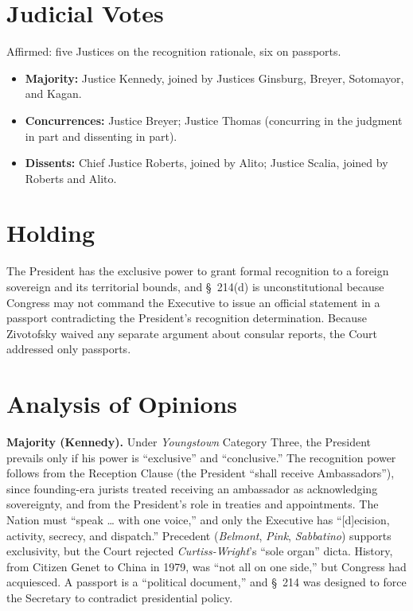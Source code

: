 \documentclass[12pt]{article}
\begin{document}
\section{Judicial Votes}

Affirmed: five Justices on the recognition rationale, six on passports.
\begin{itemize}
\item \textbf{Majority:} Justice Kennedy, joined by Justices Ginsburg, Breyer, Sotomayor, and Kagan.
\item \textbf{Concurrences:} Justice Breyer; Justice Thomas (concurring in the judgment in part and dissenting in part).
\item \textbf{Dissents:} Chief Justice Roberts, joined by Alito; Justice Scalia, joined by Roberts and Alito.
\end{itemize}

\section{Holding}

The President has the exclusive power to grant formal recognition to a foreign sovereign and its territorial bounds, and \S~214(d) is unconstitutional because Congress may not command the Executive to issue an official statement in a passport contradicting the President's recognition determination. Because Zivotofsky waived any separate argument about consular reports, the Court addressed only passports.

\section{Analysis of Opinions}

\textbf{Majority (Kennedy).} Under \textit{Youngstown} Category Three, the President prevails only if his power is ``exclusive'' and ``conclusive.'' The recognition power follows from the Reception Clause (the President ``shall receive Ambassadors''), since founding-era jurists treated receiving an ambassador as acknowledging sovereignty, and from the President's role in treaties and appointments. The Nation must ``speak \ldots{} with one voice,'' and only the Executive has ``[d]ecision, activity, secrecy, and dispatch.'' Precedent (\textit{Belmont}, \textit{Pink}, \textit{Sabbatino}) supports exclusivity, but the Court rejected \textit{Curtiss-Wright}'s ``sole organ'' dicta. History, from Citizen Genet to China in 1979, was ``not all on one side,'' but Congress had acquiesced. A passport is a ``political document,'' and \S~214 was designed to force the Secretary to contradict presidential policy.
\end{document}
